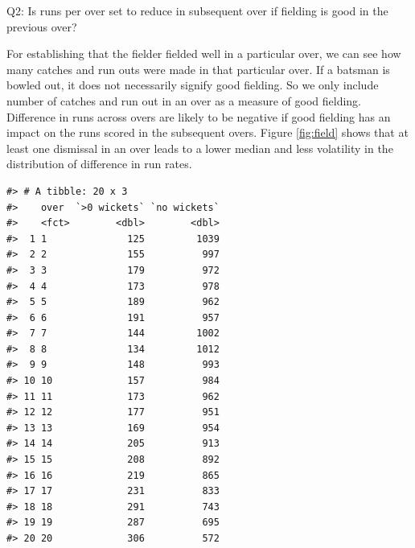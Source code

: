 \documentclass[12pt]{article}
\newenvironment{Shaded}{\begin{snugshade}}{\end{snugshade}}
\newcommand{\KeywordTok}[1]{\textcolor[rgb]{0.13,0.29,0.53}{\textbf{#1}}}
\newcommand{\NormalTok}[1]{#1}
\newcommand{\OperatorTok}[1]{\textcolor[rgb]{0.81,0.36,0.00}{\textbf{#1}}}
\newcommand{\StringTok}[1]{\textcolor[rgb]{0.31,0.60,0.02}{#1}}
\begin{document}
Q2: Is runs per over set to reduce in subsequent over if fielding is good in the previous over?

For establishing that the fielder fielded well in a particular over, we can see how many catches and run outs were made in that particular over. If a batsman is bowled out, it does not necessarily signify good fielding. So we only include number of catches and run out in an over as a measure of good fielding. Difference in runs across overs are likely to be negative if good fielding has an impact on the runs scored in the subsequent overs. Figure \ref{fig:field} shows that at least one dismissal in an over leads to a lower median and less volatility in the distribution of difference in run rates.

\begin{Shaded}
\end{Shaded}

\begin{verbatim}
#> # A tibble: 20 x 3
#>    over  `>0 wickets` `no wickets`
#>    <fct>        <dbl>        <dbl>
#>  1 1              125         1039
#>  2 2              155          997
#>  3 3              179          972
#>  4 4              173          978
#>  5 5              189          962
#>  6 6              191          957
#>  7 7              144         1002
#>  8 8              134         1012
#>  9 9              148          993
#> 10 10             157          984
#> 11 11             173          962
#> 12 12             177          951
#> 13 13             169          954
#> 14 14             205          913
#> 15 15             208          892
#> 16 16             219          865
#> 17 17             231          833
#> 18 18             291          743
#> 19 19             287          695
#> 20 20             306          572
\end{verbatim}

\begin{Shaded}
\end{Shaded}
\end{document}
